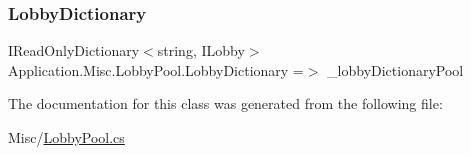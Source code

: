 \subsubsection{\texorpdfstring{Lobby\+Dictionary}{LobbyDictionary}}
{\footnotesize\ttfamily I\+Read\+Only\+Dictionary$<$string, I\+Lobby$>$ Application.\+Misc.\+Lobby\+Pool.\+Lobby\+Dictionary =$>$ \+\_\+lobby\+Dictionary\+Pool}



The documentation for this class was generated from the following file\+:\begin{DoxyCompactItemize}
\item 
Misc/\mbox{\hyperlink{_lobby_pool_8cs}{Lobby\+Pool.\+cs}}\end{DoxyCompactItemize}
